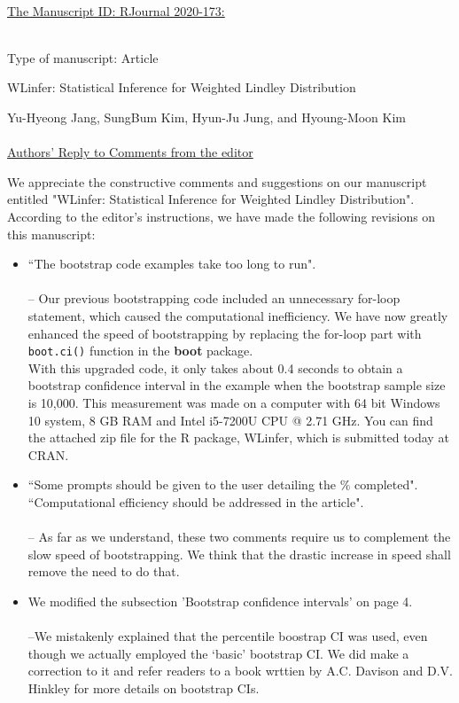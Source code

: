 \documentclass[12pt]{article}
\begin{document}
\noindent \\
{\large {\underline{The Manuscript ID: RJournal 2020-173:}}}\\\
		
		\noindent Type of manuscript: Article
		\begin{center}
			WLinfer: Statistical Inference for Weighted Lindley Distribution
		\end{center}
		Yu-Hyeong Jang, SungBum Kim, Hyun-Ju Jung, and Hyoung-Moon Kim \\ \\
{\large	\underline{Authors' Reply to Comments from the editor}} \\
\medskip


We appreciate the constructive comments and suggestions on our manuscript entitled "WLinfer: Statistical Inference for Weighted Lindley Distribution". According to the editor’s instructions, we have made the following revisions on this manuscript:\\


\begin{itemize}
  \item ``The bootstrap code examples take too long to run". 
  \\
  \\  -- Our previous bootstrapping code included an unnecessary for-loop statement, which caused the computational inefficiency. We have now greatly enhanced the speed of bootstrapping by replacing the for-loop part with \texttt{boot.ci()} function in the \textbf{boot} package.\\
  With this upgraded code, it only takes about 0.4 seconds to obtain a bootstrap confidence interval in the example when the bootstrap sample size is 10,000. This measurement was made on a computer with 64 bit Windows 10 system, 8 GB RAM and Intel i5-7200U CPU @ 2.71 GHz. You can find the attached zip file for the R package, WLinfer, which is submitted today at CRAN.
  
  \item ``Some prompts should be given to the user detailing the $\%$ completed".\\
  ``Computational efficiency should be addressed in the article".\\
  \\--  As far as we understand, these two comments require us to complement the slow speed of bootstrapping. We think that the drastic increase in speed shall remove the need to do that. 
  
  \item We modified the subsection 'Bootstrap confidence intervals' on page 4. \\
  \\
  --We mistakenly explained that the percentile boostrap CI was used, even though we actually employed the `basic' bootstrap CI. We did make a correction to it and refer readers to a book wrttien by A.C. Davison and D.V. Hinkley for more details on bootstrap CIs.
\end{itemize}
\end{document}
